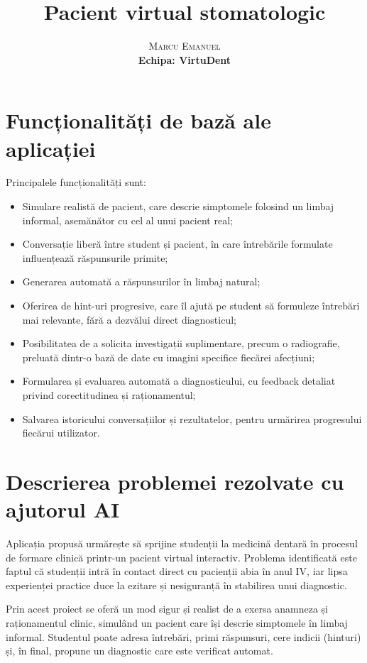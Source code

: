 \documentclass[12pt,a4paper]{article}
\title{Pacient virtual stomatologic}
\author{
  \textsc{Marcu Emanuel}\\[0.4em]
  \normalsize\textbf{Echipa: VirtuDent}
}
\date{}
\begin{document}
\maketitle
\vspace{1em}

\section{Funcționalități de bază ale aplicației}

Principalele funcționalități sunt:
\begin{itemize}
    \item Simulare realistă de pacient, care descrie simptomele folosind un limbaj informal, asemănător cu cel al unui pacient real;
    \item Conversație liberă între student și pacient, în care întrebările formulate influențează răspunsurile primite;
    \item Generarea automată a răspunsurilor în limbaj natural;
    \item Oferirea de hint-uri progresive, care îl ajută pe student să formuleze întrebări mai relevante, fără a dezvălui direct diagnosticul;
    \item Posibilitatea de a solicita investigații suplimentare, precum o radiografie, preluată dintr-o bază de date cu imagini specifice fiecărei afecțiuni;
    \item Formularea și evaluarea automată a diagnosticului, cu feedback detaliat privind corectitudinea și raționamentul;
    \item Salvarea istoricului conversațiilor și rezultatelor, pentru urmărirea progresului fiecărui utilizator.
\end{itemize}

\section{Descrierea problemei rezolvate cu ajutorul AI}

Aplicația propusă urmărește să sprijine studenții la medicină dentară în procesul de formare clinică printr-un pacient virtual interactiv.  
Problema identificată este faptul că studenții intră în contact direct cu pacienții abia în anul IV, iar lipsa experienței practice duce la ezitare și nesiguranță în stabilirea unui diagnostic.

Prin acest proiect se oferă un mod sigur și realist de a exersa anamneza și raționamentul clinic, simulând un pacient care își descrie simptomele în limbaj informal.  
Studentul poate adresa întrebări, primi răspunsuri, cere indicii (hinturi) și, în final, propune un diagnostic care este verificat automat.
\end{document}
